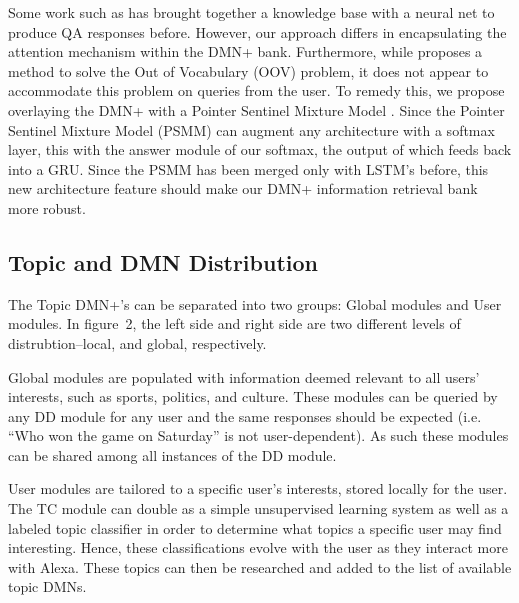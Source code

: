 \documentclass[10pt,twoside,twocolumn]{article}
\begin{document}
\noindent
Some work such as \cite{Zhang2016} has brought together a knowledge base with a neural net to produce QA responses before. However, our approach differs in encapsulating the attention mechanism within the DMN+ bank. Furthermore, while \cite{Zhang2016} proposes a method to solve the Out of Vocabulary (OOV) problem, it does not appear to accommodate this problem on queries from the user. To remedy this, we propose overlaying the DMN+ \cite{Xiong2016} with a Pointer Sentinel Mixture Model \cite{Merity2016}. Since the Pointer Sentinel Mixture Model (PSMM) can augment any architecture with a softmax layer, this with the answer module of our softmax, the output of which feeds back into a GRU. Since the PSMM has been merged only with LSTM's before, this new architecture feature should make our DMN+ information retrieval bank more robust.



\subsection{Topic and DMN Distribution}
The Topic DMN+'s can be separated into two groups: Global modules and User modules. In figure~2, the left side and right side are two different levels of distrubtion--local, and global, respectively.

\noindent
Global modules are populated with information deemed relevant to all users' interests, such as sports, politics, and culture. These modules can be queried by any DD module for any user and the same responses should be expected (i.e. ``Who won the game on Saturday'' is not user-dependent). As such these modules can be shared among all instances of the DD module.

\noindent
User modules are tailored to a specific user's interests, stored locally for the user. The TC module can double as a simple unsupervised learning system as well as a labeled topic classifier in order to determine what topics a specific user may find interesting. Hence, these classifications evolve with the user as they interact more with Alexa. These topics can then be researched and added to the list of available topic DMNs.
\end{document}

